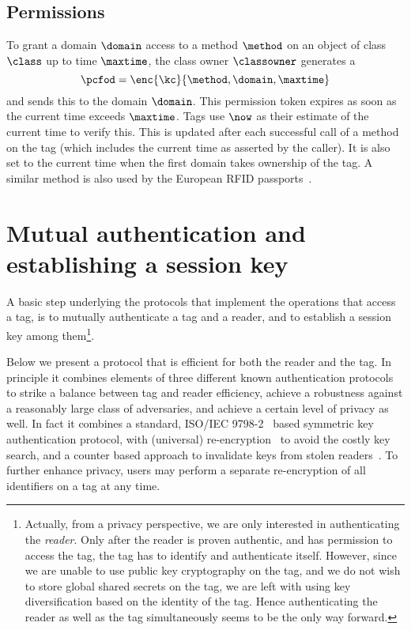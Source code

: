 \subsection{Permissions}
\label{ssec-permissions}

To grant a domain $\domain$ access to a method $\method$ on an object of
class $\class$ up to time $\maxtime$, the class owner $\classowner$ 
generates a 
\[
\pcfod = \enc{\kc}{\method,\domain,\maxtime} 
\] 
and sends this to the domain $\domain$. This permission token expires as soon as the
current 
time exceeds $\maxtime$. Tags use $\now$ as their estimate of the current time
to verify this. 
This is updated after each successful call of a method on the tag (which
includes the current time as asserted by the caller).
It is also set to the current time when the first domain takes ownership of the
tag. 
A similar method is also used by the European RFID
passports~\cite{bsi2006extendedaccesscontrol,hoepman2006crossingborders}. 


\section{Mutual authentication and establishing a session key}
\label{sec-auth}

A basic step underlying the protocols that implement the operations that access
a tag, is to mutually authenticate a tag and a reader, and to establish a
session key among them\footnote{Actually, from a privacy perspective, we are only interested in
	authenticating the \emph{reader}. Only after the reader is
	proven  authentic, and has permission to access the tag, the tag
	has to identify and authenticate itself. However, since we are unable
	to use public key cryptography on the tag, and we do not wish to store
	global shared secrets on the tag, we are left with using key
	diversification based on the identity of the tag. Hence
	authenticating the reader as well as the tag simultaneously 
	seems to be the only way forward. 
}. 

Below we present a protocol that is efficient for both the reader and the tag. 
In principle it combines elements of three different known authentication
protocols to strike a balance between tag and reader efficiency, achieve a
robustness against a reasonably large class of adversaries, and achieve a
certain level of privacy as well. In fact it combines a standard, 
ISO/IEC 9798-2~\cite{ISO9798-2} based symmetric key authentication protocol, 
with (universal) re-encryption~\cite{juels2003squealing,golle2004reencryption}
to avoid the costly key search, and 
a counter based approach to invalidate keys from stolen 
readers~\cite{avoine2009compromised-readers}.
To further enhance privacy, users may perform a separate re-encryp\-tion of all
identifiers on a tag at any time.

